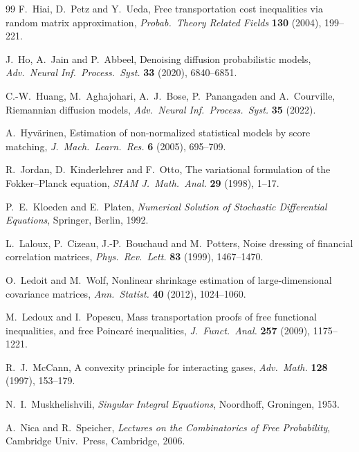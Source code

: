 \documentclass[11pt]{article}
\theoremstyle{plain}
\theoremstyle{definition}
\theoremstyle{remark}
\begin{document}
\begin{singlespace}
\begin{thebibliography}{99}
F.~Hiai, D.~Petz and Y.~Ueda,
Free transportation cost inequalities via random matrix approximation,
\emph{Probab.\ Theory Related Fields} \textbf{130} (2004), 199--221.

J.~Ho, A.~Jain and P.~Abbeel,
Denoising diffusion probabilistic models,
\emph{Adv.\ Neural Inf.\ Process.\ Syst.} \textbf{33} (2020), 6840--6851.

C.-W.~Huang, M.~Aghajohari, A.~J.~Bose, P.~Panangaden and A.~Courville,
Riemannian diffusion models,
\emph{Adv.\ Neural Inf.\ Process.\ Syst.} \textbf{35} (2022).

A.~Hyv\"arinen,
Estimation of non-normalized statistical models by score matching,
\emph{J.\ Mach.\ Learn.\ Res.} \textbf{6} (2005), 695--709.

R.~Jordan, D.~Kinderlehrer and F.~Otto,
The variational formulation of the Fokker--Planck equation,
\emph{SIAM J.\ Math.\ Anal.} \textbf{29} (1998), 1--17.

P.~E.~Kloeden and E.~Platen,
\emph{Numerical Solution of Stochastic Differential Equations}, Springer, Berlin, 1992.

L.~Laloux, P.~Cizeau, J.-P.~Bouchaud and M.~Potters,
Noise dressing of financial correlation matrices,
\emph{Phys.\ Rev.\ Lett.} \textbf{83} (1999), 1467--1470.

O.~Ledoit and M.~Wolf,
Nonlinear shrinkage estimation of large-dimensional covariance matrices,
\emph{Ann.\ Statist.} \textbf{40} (2012), 1024--1060.

M.~Ledoux and I.~Popescu,
Mass transportation proofs of free functional inequalities, and free Poincar\'e
inequalities, \emph{J.\ Funct.\ Anal.} \textbf{257} (2009), 1175--1221.

R.~J.~McCann,
A convexity principle for interacting gases,
\emph{Adv.\ Math.} \textbf{128} (1997), 153--179.

N.~I.~Muskhelishvili,
\emph{Singular Integral Equations}, Noordhoff, Groningen, 1953.

A.~Nica and R.~Speicher,
\emph{Lectures on the Combinatorics of Free Probability},
Cambridge Univ.\ Press, Cambridge, 2006.


\end{thebibliography}
\end{singlespace}
\end{document}
